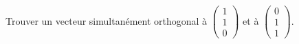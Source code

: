 
\begin{exercice}\label{exoOutilsMath-0069}

    Trouver un vecteur simultanément orthogonal à $\begin{pmatrix}
        1    \\ 
        1    \\ 
        0    
    \end{pmatrix}$ et à $\begin{pmatrix}
        0    \\ 
        1    \\ 
        1    
    \end{pmatrix}$.

\end{exercice}
